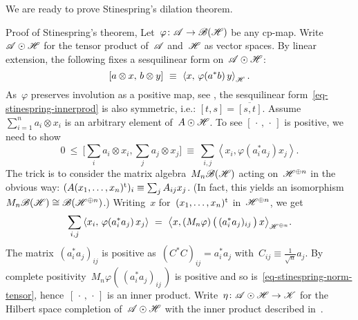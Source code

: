 \begin{parsec}%
\begin{point}%
We are ready to prove Stinespring's dilation theorem.
\begin{point}{%
    Proof of Stinespring's theorem, }%
Let~$\varphi\colon \mathscr{A} \to \mathscr{B}(\mathscr{H})$
    be any cp-map.
Write~$\mathscr{A} \odot \mathscr{H}$ for the tensor product of~$\mathscr{A}$ and~$\mathscr{H}$
    as vector spaces.
By linear extension,
the following fixes a sesquilinear form on~$\mathscr{A} \odot \mathscr{H}$:
\begin{equation}\label{eq-stinespring-innerprod}
    [a\otimes x,\, b \otimes y] \ \equiv\  \left<x, \,\varphi(a^*b)\, y\right>_{\mathscr{H}}.
\end{equation}
As~$\varphi$ preserves involution as a positive map,
see ,
the sesquilinear form~\eqref{eq-stinespring-innerprod}
is also symmetric, i.e.: $[t,s]=\overline{[s,t]}$.
    Assume~$\sum^n_{i=1} a_i\otimes x_i$
is an arbitrary element of~$A \odot \mathscr{H}$.
To see $[\,\cdot\,,\,\cdot\,]$ is positive,
we need to show
\begin{equation*}
    0 \ \leq\  \bigl[\sum_i a_i\otimes x_i, \sum_j a_j\otimes x_j\bigr]
        \ \equiv\  \sum_{i,j} \left< x_i, \varphi(a_i^*a_j) x_j \right>.
\end{equation*}
The trick is to consider the matrix algebra~$M_n\mathscr{B}(\mathscr{H})$
acting on~$\mathscr{H}^{\oplus n}$ in the obvious way:
$(A (x_1,\ldots,x_n)^{\mathrm{t}})_i \equiv \sum_j A_{ij} x_j$.
(In fact, this yields an
    isomorphism~$M_n\mathscr{B}(\mathscr{H}) \cong \mathscr{B}(\mathscr{H}^{\oplus n})$.)
Writing~$x$ for~$(x_1,\ldots,x_n)^{\mathrm{t}}$ in~$\mathscr{H}^{\oplus n}$,
    we get
\begin{equation}\label{eq-stinespring-norm-tensor}
    \sum_{i,j} \left< x_i, \,\varphi(a_i^*a_j)\, x_j \right>
    \ =\  \bigl<
    x,
    (M_n\varphi) \,\bigl(\, (a_i^*a_j)_{ij} \, \bigr)\,
    x \bigr>_{\mathscr{H}^{\oplus n}}.
\end{equation}
The matrix~$(a_i^*a_j)_{ij}$
is positive as~$(C^*C)_{ij} = a_i^*a_j$
    with~$C_{ij} \equiv \frac{1}{\sqrt{n}} a_j$.
    By complete positivity~$M_n\varphi(\,(a_i^*a_j)_{ij}\,)$ is positive
    and so is~\eqref{eq-stinespring-norm-tensor},
    hence~$[\,\cdot\,,\,\cdot\,]$ is an inner product.
Write~$\eta\colon \mathscr{A}\odot \mathscr{H} \to \mathscr{K}$ for the Hilbert space completion
    of~$\mathscr{A} \odot \mathscr{H}$ with the inner product
    described in~.
\begin{point}%

\end{point}
\end{point}
\end{point}
\end{parsec}
